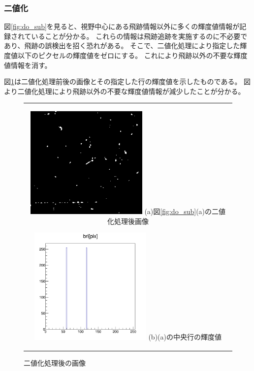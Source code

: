 \documentclass[12pt,a4paper]{jarticle}
\begin{document}
\subsubsection{二値化}
図\ref{fig:do_sub}を見ると、視野中心にある飛跡情報以外に多くの輝度値情報が記録されていることが分かる。
これらの情報は飛跡追跡を実施するのに不必要であり、飛跡の誤検出を招く恐れがある。
そこで、二値化処理により指定した輝度値以下のピクセルの輝度値をゼロにする。
これにより飛跡以外の不要な輝度値情報を消す。
\par
図\ref{fig:do_thre}は二値化処理前後の画像とその指定した行の輝度値を示したものである。
図より二値化処理により飛跡以外の不要な輝度値情報が減少したことが分かる。
\begin{figure}[htbp]
  \centering
      \begin{tabular}{c}
        \begin{minipage}{0.5\hsize}
          \centering
            \includegraphics[clip, width=60mm]{thre.png}
            \hspace{1.6cm} (a)図\ref{fig:do_sub}(a)の二値化処理後画像
        \end{minipage}

        \begin{minipage}{0.5\hsize}
          \centering
            \includegraphics[clip, width=60mm]{thre_hist.png}
            \hspace{1.6cm} (b)(a)の中央行の輝度値
        \end{minipage}
    
      \end{tabular}
      \caption{二値化処理後の画像\label{fig:do_thre}}
\end{figure}
\end{document}
